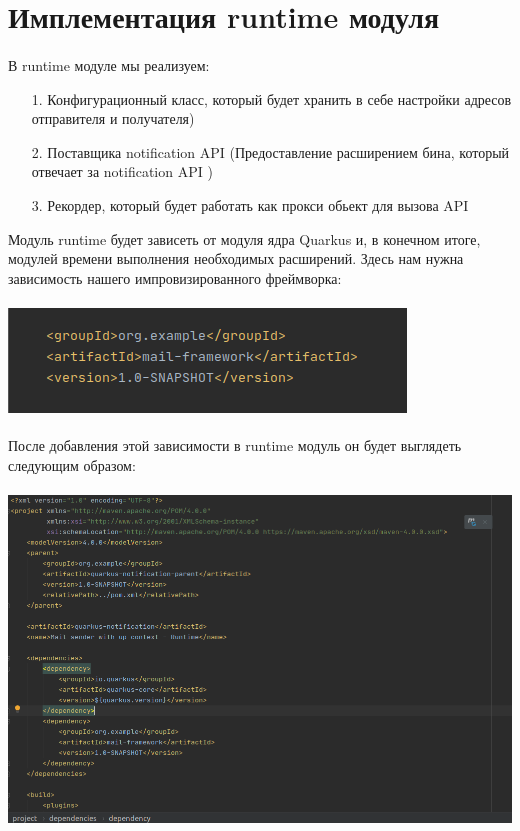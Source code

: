 \documentclass[russian,11pt]{article}
\begin{document}
\section{Имплементация runtime модуля}
\paragraph{ }
В runtime модуле мы реализуем:
 \begin{enumerate}
		\item[  1.] Конфигурационный класс, который будет хранить в себе настройки адресов отправителя и получателя)
		\item[  2.] Поставщика notification API (Предоставление расширением бина, который отвечает за notification API )
		\item[  3.] Рекордер, который будет работать как прокси обьект для вызова API
	\end{enumerate} 
	
	Модуль runtime будет зависеть от модуля ядра Quarkus и, в конечном итоге, модулей времени выполнения необходимых расширений. Здесь нам нужна зависимость нашего импровизированного фреймворка:

\paragraph{\includegraphics[scale=1.5, width=\textwidth]{4}}


После добавления этой зависимости в runtime модуль он будет выглядеть следующим образом:

\paragraph{\includegraphics[scale=1.5, width=\textwidth]{5}}
\end{document}
